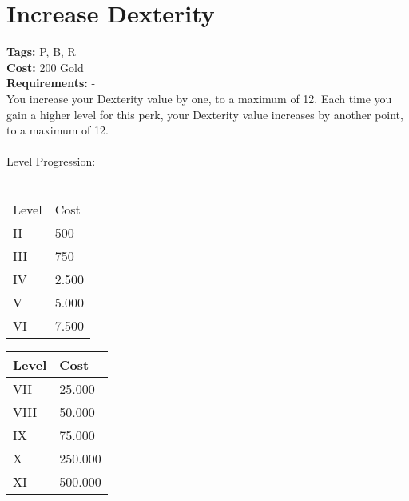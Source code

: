 \section{Increase Dexterity}\label{sec:increasedexterity}
\textbf{Tags:} P, B, R\\
\textbf{Cost:} 200 Gold\\
\textbf{Requirements:} -\\
You increase your Dexterity value by one, to a maximum of 12.
Each time you gain a higher level for this perk, your Dexterity value increases by another point, to a maximum of 12.\\
\\
Level Progression:\\
\\
\begin{minipage}{0.5\textwidth}
    \begin{tabular}{l | l}
        Level & Cost\\
        II & 500\\
        III & 750\\
        IV & 2.500\\
        V & 5.000\\
        VI & 7.500\\
    \end{tabular}
\end{minipage}
\begin{minipage}{0.5\textwidth}
    \begin{tabular}{l | l}
        Level & Cost\\ \hline
        VII & 25.000\\
        VIII & 50.000\\
        IX & 75.000\\
        X & 250.000\\
        XI & 500.000\\
    \end{tabular}
\end{minipage}

